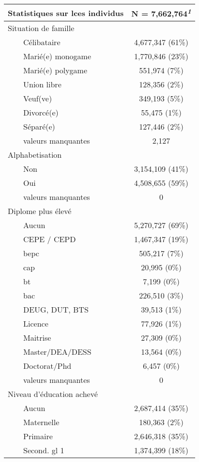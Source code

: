 \documentclass[
]{article}
\begin{document}
\begin{table}[!t]
\fontsize{12.0pt}{14.4pt}\selectfont
\begin{tabular*}{\linewidth}{@{\extracolsep{\fill}}lc}
\toprule
Statistiques sur lces individus & \textbf{N = 7,662,764}\textsuperscript{\textit{1}} \\ 
\midrule\addlinespace[2.5pt]
Situation de famille &  \\ 
    Célibataire & 4,677,347 (61\%) \\ 
    Marié(e) monogame & 1,770,846 (23\%) \\ 
    Marié(e) polygame & 551,974 (7\%) \\ 
    Union libre & 128,356 (2\%) \\ 
    Veuf(ve) & 349,193 (5\%) \\ 
    Divorcé(e) & 55,475 (1\%) \\ 
    Séparé(e) & 127,446 (2\%) \\ 
    valeurs manquantes & 2,127 \\ 
Alphabetisation &  \\ 
    Non & 3,154,109 (41\%) \\ 
    Oui & 4,508,655 (59\%) \\ 
    valeurs manquantes & 0 \\ 
Diplome plus élevé &  \\ 
    Aucun & 5,270,727 (69\%) \\ 
    CEPE / CEPD & 1,467,347 (19\%) \\ 
    bepc & 505,217 (7\%) \\ 
    cap & 20,995 (0\%) \\ 
    bt & 7,199 (0\%) \\ 
    bac & 226,510 (3\%) \\ 
    DEUG, DUT, BTS & 39,513 (1\%) \\ 
    Licence & 77,926 (1\%) \\ 
    Maitrise & 27,309 (0\%) \\ 
    Master/DEA/DESS & 13,564 (0\%) \\ 
    Doctorat/Phd & 6,457 (0\%) \\ 
    valeurs manquantes & 0 \\ 
Niveau d'éducation achevé &  \\ 
    Aucun & 2,687,414 (35\%) \\ 
    Maternelle & 180,363 (2\%) \\ 
    Primaire & 2,646,318 (35\%) \\ 
    Second. gl 1 & 1,374,399 (18\%) \\ 

\end{tabular*}
\end{table}
\end{document}
